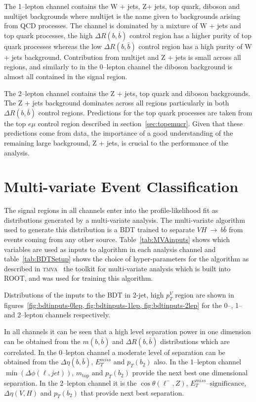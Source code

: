 

The 1--lepton channel contains the W + jets, Z+ jets, top quark, diboson and multijet
backgrounds where multijet is the name given to backgrounds arising from QCD
processes. The channel is dominated by a mixture of W + jets and top quark
processes, the high $\Delta R(b, \bar{b})$ control region has a higher purity of
top quark processes whereas the low $\Delta R(b, \bar{b})$ control region has a
high purity of W + jets background. Contribution from multijet and Z + jets is
small across all regions, and similarly to in the 0--lepton channel the diboson
background is almost all contained in the signal region.

The 2--lepton channel contains the Z + jets, top quark and diboson backgrounds.
The Z + jets background dominates across all regions particularly in both
$\Delta R(b, \bar{b})$ control regions. Predictions for the top quark processes
are taken from the top $e \mu$ control region described in
section~\ref{sec:topemucr}. Given that these predictions come from data, the
importance of a good understanding of the remaining large background, Z + jets,
is crucial to the performance of the analysis.

\section{Multi-variate Event Classification}%
\label{sec:mva}

The signal regions in all channels enter into the profile-likelihood fit as
distributions generated by a multi-variate analysis. The multi-variate algorithm
used to generate this distribution is a BDT trained to separate
$VH~\rightarrow~b\bar{b}$ from events coming from any other source.
Table~\ref{tab:MVAinputs} shows which variables are used as inputs to algorithm
in each analysis channel and table~\ref{tab:BDTSetup} shows the choice of
hyper-parameters for the algorithm as described in \textsc{tmva}~\cite{TMVA} the
toolkit for multi-variate analysis which is built into \textsc{ROOT}, and was
used for training this algorithm.


Distributions of the inputs to the BDT in 2-jet, high $p_T^V$ region
are shown in
figures~\ref{fig:bdtinputs-0lep, fig:bdtinputs-1lep, fig:bdtinputs-2lep}
for the 0--, 1-- and 2--lepton channels respectively.

In all channels it can be seen that a high level separation power in one
dimension can be obtained from the $m(b,\bar{b})$ and $\Delta R (b, \bar{b})$
distributions which are correlated. In the 0--lepton channel a moderate level of
separation can be obtained from the $\Delta \eta(b, \bar{b})$, $E_T^{miss}$ and
$p_T(b_2)$ also. In the 1--lepton channel $\min(\Delta\phi(\ell,jet))$,
$m_{\text{top}}$ and $p_T(b_2)$ provide the next best one dimensional
separation. In the 2--lepton channel it is the $\cos{\theta(\ell^-,Z)}$,
$E_T^{miss}\text{--significance}$, $\Delta \eta(V, H)$ and $p_T(b_2)$ that
provide next best separation.
  
